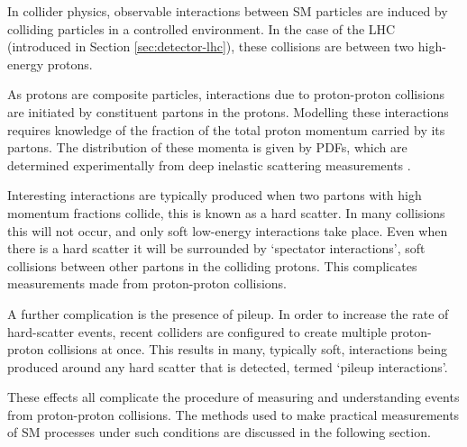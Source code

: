 
In collider physics, observable interactions between \ac{SM} particles are
induced by colliding particles in a controlled environment. In the case of the
\acs{LHC} (introduced in Section \ref{sec:detector-lhc}), these collisions are
between two high-energy protons.

As protons are composite particles, interactions due to proton-proton collisions
are initiated by constituent partons in the protons. Modelling these
interactions requires knowledge of the fraction of the total proton momentum
carried by its partons. The distribution of these momenta is given by
\acp{PDF}, which are determined experimentally from deep inelastic scattering
measurements \cite{NNPDF3dot1}.

Interesting interactions are typically produced when two partons with high
momentum fractions collide, this is known as a hard scatter. In many collisions
this will not occur, and only soft low-energy interactions take place. Even when
there is a hard scatter it will be surrounded by `spectator interactions', soft
collisions between other partons in the colliding protons. This complicates
measurements made from proton-proton collisions.

A further complication is the presence of pileup. In order to increase the
rate of hard-scatter events, recent colliders are configured to create multiple
proton-proton collisions at once. This results in many, typically soft,
interactions being produced around any hard scatter that is detected, termed
`pileup interactions'.

These effects all complicate the procedure of measuring and understanding events
from proton-proton collisions. The methods used to make practical measurements
of \ac{SM} processes under such conditions are discussed in the following
section.
